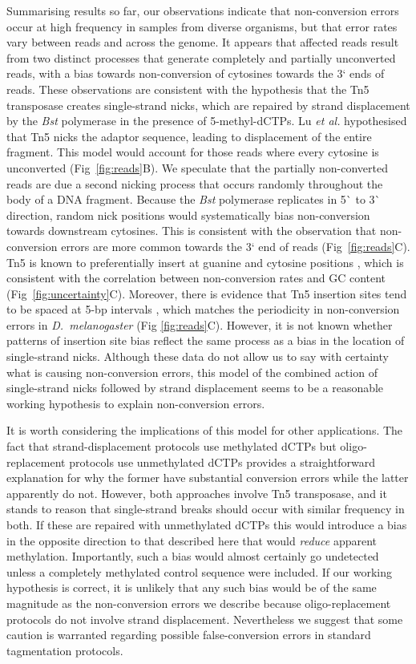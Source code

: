 \documentclass[10pt,draft,letterpaper]{article}
\begin{document}
Summarising results so far, our observations indicate that non-conversion errors occur at high frequency in samples from diverse organisms, but that error rates vary between reads and across the genome.
It appears that affected reads result from two distinct processes that generate completely and partially unconverted reads, with a bias towards non-conversion of cytosines towards the 3` ends of reads.
These observations are consistent with the hypothesis that the Tn5 transposase creates single-strand nicks, which are repaired by strand displacement by the \textit{Bst} polymerase in the presence of 5-methyl-dCTPs.
Lu \textit{et al.} \cite{lu2015improved} hypothesised that Tn5 nicks the adaptor sequence, leading to displacement of the entire fragment.
This model would account for those reads where every cytosine is unconverted (Fig~\ref{fig:reads}B).
We speculate that the partially non-converted reads are due a second nicking process that occurs randomly throughout the body of a DNA fragment.
Because the \textit{Bst} polymerase replicates in 5\`{} to 3\`{} direction, random nick positions would systematically bias non-conversion towards downstream cytosines.
This is consistent with the observation that non-conversion errors are more common towards the 3` end of reads (Fig~\ref{fig:reads}C).
Tn5 is known to preferentially insert at guanine and cytosine positions \cite{goryshin1998tn, green2012insertion},
which is consistent with the correlation between non-conversion rates and GC content (Fig~\ref{fig:uncertainty}C).
Moreover, there is evidence that Tn5 insertion sites tend to be spaced at 5-bp intervals \cite{goryshin1998tn}, which matches the periodicity in non-conversion errors in \textit{D.~melanogaster} (Fig \ref{fig:reads}C).
However, it is not known whether patterns of insertion site bias reflect the same process as a bias in the location of single-strand nicks.
Although these data do not allow us to say with certainty what is causing non-conversion errors, this model of the combined action of single-strand nicks followed by strand displacement seems to be a reasonable working hypothesis to explain non-conversion errors.

It is worth considering the implications of this model for other applications.
The fact that strand-displacement protocols use methylated dCTPs but oligo-replacement protocols use unmethylated dCTPs provides a straightforward explanation for why the former have substantial conversion errors while the latter apparently do not.
However, both approaches involve Tn5 transposase, and it stands to reason that single-strand breaks should occur with similar frequency in both.
If these are repaired with unmethylated dCTPs this would introduce a bias in the opposite direction to that described here that would \textit{reduce} apparent methylation.
Importantly, such a bias would almost certainly go undetected unless a completely methylated control sequence were included.
If our working hypothesis is correct, it is unlikely that any such bias would be of the same magnitude as the non-conversion errors we describe because oligo-replacement protocols do not involve strand displacement.
Nevertheless we suggest that some caution is warranted regarding possible false-conversion errors in standard tagmentation protocols.
\end{document}
